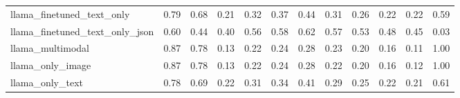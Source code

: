 \begin{table}
\begin{tabular}{lrrrrrrrrrrr}
llama_finetuned_text_only & 0.79 & 0.68 & 0.21 & 0.32 & 0.37 & 0.44 & 0.31 & 0.26 & 0.22 & 0.22 & 0.59 \\
llama_finetuned_text_only_json & 0.60 & 0.44 & 0.40 & 0.56 & 0.58 & 0.62 & 0.57 & 0.53 & 0.48 & 0.45 & 0.03 \\
llama_multimodal & 0.87 & 0.78 & 0.13 & 0.22 & 0.24 & 0.28 & 0.23 & 0.20 & 0.16 & 0.11 & 1.00 \\
llama_only_image & 0.87 & 0.78 & 0.13 & 0.22 & 0.24 & 0.28 & 0.22 & 0.20 & 0.16 & 0.12 & 1.00 \\
llama_only_text & 0.78 & 0.69 & 0.22 & 0.31 & 0.34 & 0.41 & 0.29 & 0.25 & 0.22 & 0.21 & 0.61 \\
\bottomrule
\end{tabular}
\end{table}
